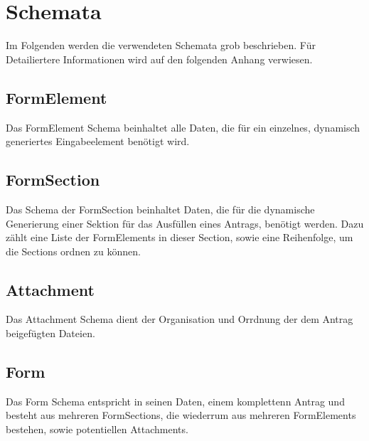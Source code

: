 \section{Schemata}
Im Folgenden werden die verwendeten Schemata grob beschrieben. Für Detailiertere Informationen 
wird auf den folgenden Anhang verwiesen.

\subsection{FormElement}
Das FormElement Schema beinhaltet alle Daten, die für ein einzelnes, dynamisch generiertes 
Eingabeelement benötigt wird.

\subsection{FormSection}
Das Schema der FormSection beinhaltet Daten, die für die dynamische Generierung einer Sektion
für das Ausfüllen eines Antrags, benötigt werden. Dazu zählt eine Liste der FormElements in 
dieser Section, sowie eine Reihenfolge, um die Sections ordnen zu können.

\subsection{Attachment}
Das Attachment Schema dient der Organisation und Orrdnung der dem Antrag beigefügten Dateien.

\subsection{Form}
Das Form Schema entspricht in seinen Daten, einem komplettenn Antrag und besteht aus mehreren 
FormSections, die wiederrum aus mehreren FormElements bestehen, sowie potentiellen Attachments.
